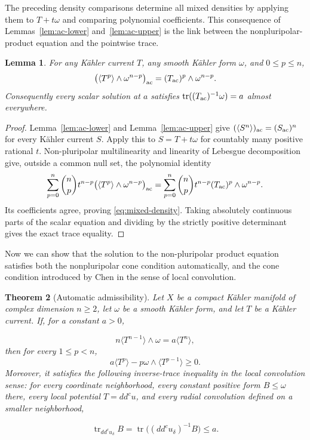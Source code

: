 \documentclass[reqno]{amsart}
\numberwithin{equation}{section}
\newtheorem{theorem}{Theorem}[section]
\newtheorem{lemma}[theorem]{Lemma}
\theoremstyle{definition}
\DeclareMathOperator{\tr}{tr}
\begin{document}
The preceding density comparisons determine all mixed densities
by applying them to $T+t\omega$ and comparing polynomial
coefficients. This consequence of
Lemmas~\ref{lem:ac-lower} and~\ref{lem:ac-upper}
is the link between the nonpluripolar-product equation and the pointwise trace.
\begin{lemma}\label{lem:mixed-density}
For any K\"ahler current $T$, any smooth K\"ahler form $\omega$, and $0\leq p\leq n$,
\begin{equation}\label{eq:mixed-density}
\big(\langle T^p\rangle\wedge\omega^{n-p}\big)_{\rm ac}
=(T_{\rm ac})^p\wedge\omega^{n-p}.
\end{equation}
Consequently every scalar solution at $a$ satisfies
$\tr((T_{\rm ac})^{-1}\omega)=a$ almost everywhere.
\end{lemma}
\begin{proof}
Lemma~\ref{lem:ac-lower} and Lemma~\ref{lem:ac-upper} give
$(\langle S^n\rangle)_{\rm ac}=(S_{\rm ac})^n$
for every K\"ahler current $S$. Apply this to $S=T+t\omega$ for countably many positive rational $t$. Non-pluripolar multilinearity and linearity of Lebesgue decomposition give, outside a common null set, the polynomial identity
\[
\sum_{p=0}^n\binom np t^{n-p}
\big(\langle T^p\rangle\wedge\omega^{n-p}\big)_{\rm ac}
=
\sum_{p=0}^n\binom np t^{n-p}
(T_{\rm ac})^p\wedge\omega^{n-p}.
\]
Its coefficients agree, proving \eqref{eq:mixed-density}. Taking absolutely continuous parts of the scalar equation and dividing by the strictly positive determinant gives the exact trace equality.
\end{proof}
Now we can show that the solution to the non-pluripolar product equation satisfies both the nonpluripolar cone condition automatically, and the cone condition introduced by Chen \cite{C21} in the sense of local convolution. 
\begin{theorem}[Automatic admissibility]\label{thm:automatic-cone}
    Let $X$ be a compact K\"ahler manifold of complex dimension $n\geq2$, let $\omega$ be a smooth K\"ahler form, and let $T$ be a K\"ahler current. If, for a constant $a>0$,

\begin{equation}\label{eq:scalar-equation}
n\langle T^{n-1}\rangle\wedge\omega
=a\langle T^n\rangle,
\end{equation}
then for every $1\leq p<n$,
\begin{equation}\label{eq:scalar-cone}
a\langle T^p\rangle-p\omega\wedge\langle T^{p-1}\rangle\geq0.
\end{equation}
Moreover, it satisfies the following inverse-trace inequality in the local convolution sense: for every coordinate neighborhood, every constant positive form $B\leq\omega$ there, every local potential $T=dd^cu$, and every radial convolution defined on a smaller neighborhood,

\begin{equation}\label{eq:scalar-density}
\tr_{dd^cu_\delta}B
=\tr\bigl((dd^cu_\delta)^{-1}B\bigr)\leq a.
\end{equation}
\end{theorem}
\end{document}
